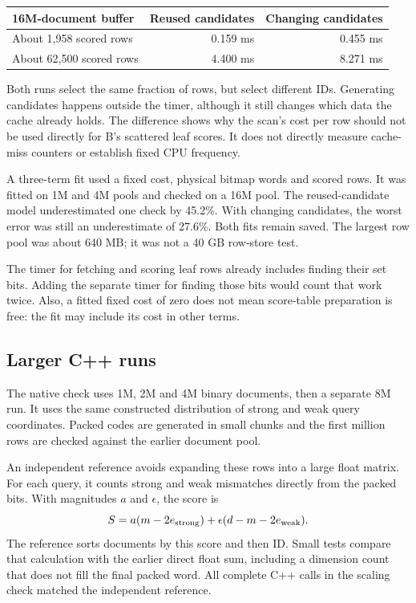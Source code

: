 \begin{center}\small
\begin{tabular}{@{}lrr@{}}\toprule
16M-document buffer & Reused candidates & Changing candidates\\\midrule
About 1,958 scored rows & 0.159 ms & 0.455 ms\\
About 62,500 scored rows & 4.400 ms & 8.271 ms\\\bottomrule
\end{tabular}\normalsize\end{center}
Both runs select the same fraction of rows, but select different IDs. Generating candidates
happens outside the timer, although it still changes which data the cache already holds. The difference shows why the scan's cost per row should
not be used directly for B's scattered leaf scores. It does not directly measure cache-miss
counters or establish fixed CPU frequency.

A three-term fit used a fixed cost, physical bitmap words and scored rows. It was fitted on
1M and 4M pools and checked on a 16M pool. The reused-candidate model underestimated one check
by 45.2\%. With changing candidates, the worst error was still an underestimate of 27.6\%.
Both fits remain saved. The largest row pool was about 640 MB; it was not a 40 GB row-store test.

The timer for fetching and scoring leaf rows already includes finding their set bits.
Adding the separate timer for finding those bits would count that work twice. Also, a fitted
fixed cost of zero does not mean score-table preparation is free: the fit may include its
cost in other terms.

\subsection{Larger C++ runs}
The native check uses 1M, 2M and 4M binary documents, then a separate 8M run. It uses the same
constructed distribution of strong and weak query coordinates. Packed codes are generated in small chunks and
the first million rows are checked against the earlier document pool.

An independent reference avoids expanding these rows into a large float matrix. For each query,
it counts strong and weak mismatches directly from the packed bits. With magnitudes $a$ and
$\epsilon$, the score is
\[
S=a(m-2e_{\rm strong})+\epsilon(d-m-2e_{\rm weak}).
\]
The reference sorts documents by this score and then ID. Small tests compare that calculation with the earlier direct
float sum, including a dimension count that does not fill the final packed word. All complete
C++ calls in the scaling check matched the independent reference.

